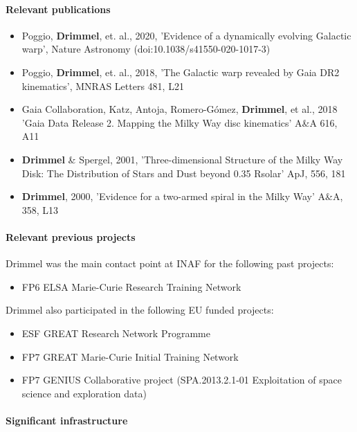 \paragraph{Relevant publications}
\begin{itemize}
    \item Poggio, \textbf{Drimmel}, et. al., 2020, 'Evidence of a dynamically evolving Galactic warp', Nature Astronomy (doi:10.1038/s41550-020-1017-3)
    \item Poggio, \textbf{Drimmel}, et. al., 2018, 'The Galactic warp revealed by Gaia DR2 kinematics', MNRAS Letters 481, L21
    \item  Gaia Collaboration, Katz, Antoja, Romero-G\'omez, \textbf{Drimmel}, et al., 2018 'Gaia Data Release 2. Mapping the Milky Way disc kinematics' A\&A 616, A11
    \item \textbf{Drimmel} \& Spergel, 2001, 'Three-dimensional Structure of the Milky Way Disk: The Distribution of Stars and Dust beyond 0.35 Rsolar' ApJ, 556, 181
    \item \textbf{Drimmel}, 2000, 'Evidence for a two-armed spiral in the Milky Way' A\&A, 358, L13
\end{itemize}

\paragraph{Relevant previous projects}

Drimmel was the main contact point at INAF for the following past projects:
\begin{itemize}
    \item FP6 ELSA Marie-Curie Research Training Network
\end{itemize}
Drimmel also participated in the following EU funded projects: 
\begin{itemize}
    \item ESF GREAT Research Network Programme 
    \item FP7 GREAT Marie-Curie Initial Training Network
    \item FP7 GENIUS Collaborative project (SPA.2013.2.1-01 Exploitation of space science and exploration data)
\end{itemize}


\paragraph{Significant infrastructure}